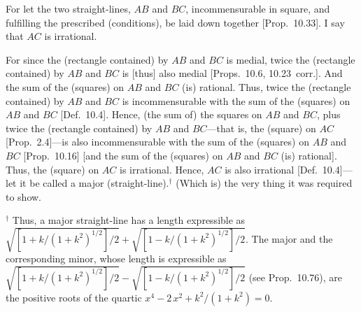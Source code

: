 \begin{Parallel}{}{}
{\epsfysize=0.3in
\centerline{}

For let the two straight-lines, $AB$ and $BC$,  incommensurable
in square, and fulfilling  the  prescribed (conditions), be laid down together [Prop.~10.33]. I say that $AC$ is irrational.

For since the (rectangle contained) by $AB$ and $BC$ is medial, twice
the (rectangle contained) by $AB$ and $BC$ is [thus] also medial [Props.~10.6, 10.23~corr.].
And the sum of the (squares) on $AB$ and $BC$ (is) rational. Thus, twice
the (rectangle contained) by $AB$ and $BC$ is incommensurable with the
sum of the (squares) on $AB$ and $BC$ [Def.~10.4].
Hence, (the sum of) the squares on $AB$ and $BC$, plus twice the
(rectangle contained) by $AB$ and $BC$---that is, the (square) on $AC$ [Prop.~2.4]---is also
incommensurable with the sum of the (squares) on $AB$ and $BC$
[Prop.~10.16] [and the
sum of the (squares) on $AB$ and $BC$ (is) rational]. Thus, the (square) on $AC$ is irrational. Hence, $AC$ is also irrational [Def.~10.4]---let it be called a major (straight-line).$^\dag$ (Which is) the
very thing it was required to show.}
\end{Parallel}
{\footnotesize\noindent$^\dag$ Thus, a major straight-line
has a length expressible as $\sqrt{[1+k/(1+k^2)^{1/2}]/2} + \sqrt{[1-k/(1+k^2)^{1/2}]/2}$. The major and the corresponding minor, whose length is expressible as $\sqrt{[1+k/(1+k^2)^{1/2}]/2} - \sqrt{[1-k/(1+k^2)^{1/2}]/2}$ (see Prop.~10.76), are
the positive roots of the quartic $x^4-2\,x^2+ k^2/(1+k^2) = 0$.}


